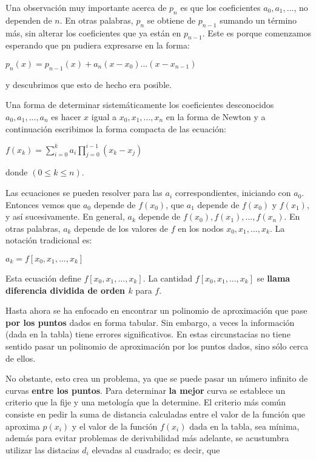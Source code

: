 \documentclass[10pt,a4paper]{article}
\begin{document}
\begin{multicols}{2}
\noindent Una observación muy importante acerca de $p_n$ es que los coeficientes $a_0, a_1,. ..$, no dependen de $n$. En otras palabras, $p_n$ se obtiene de $p_{n-1}$ sumando un término más, sin alterar los coeficientes que ya están en $p_{n-1}$. Este es porque comenzamos esperando que pn pudiera expresarse en la forma:
\begin{center}
	$p_n(x) = p_{n-1}(x) + a_n(x-x_0)...(x-x_{n-1})$
\end{center}


y descubrimos que esto de hecho era posible.

\noindent Una forma de determinar sistemáticamente los coeficientes desconocidos $a_0, a_1, . . . , a_n$ es hacer $x$ igual a $x_0, x_1, . . . , x_n$ en la forma de Newton y a continuación escribimos la forma compacta de las ecuación:
\begin{center}
	$f(x_k) = \displaystyle\sum_{i=0}^k a_i \displaystyle\prod_{j=0}^{i-1} (x_k - x_j)$
	
\end{center}
donde $(0 \le k \le n)$.

\noindent Las ecuaciones se pueden resolver para las $a_i$ correspondientes, iniciando con $a_0$. Entonces vemos que $a_0$ depende de $f(x_0)$, que $a_1$ depende de $f(x_0)$ y $f(x_1)$, y así sucesivamente. En general, $a_k$ depende de $f(x_0), f(x_1), . . . , f(x_n)$. En otras palabras, $a_k$ depende de los valores de $f$ en los nodos $x_0, x_1, . . . , x_k$. La notación tradicional es:
\begin{center}
	$a_k = f [x_0, x_1, . . . , x_k]$
\end{center}


\noindent Esta ecuación define $f[x_0, x_1, . . . , x_k]$. La cantidad $f [x_0, x_1, . . . , x_k]$ se \textbf{llama diferencia dividida de
orden $k$} para $f$.

\vspace*{0.2cm}


\vspace*{0.2cm}

Hasta ahora se ha enfocado en encontrar un polinomio de aproximación que pase \textbf{por los puntos} dados en forma tabular. Sin embargo, a veces la información (dada en la tabla) tiene errores significativos. En estas circunstacias no tiene sentido pasar un polinomio de aproximación por los puntos dados, sino sólo cerca de ellos.

No obstante, esto crea un problema, ya que se puede pasar un número infinito de curvas \textbf{entre los puntos}. Para determinar \textbf{la mejor} curva se establece un criterio que la fije y una metología que la determine. El criterio más común  consiste en pedir la suma de distancia calculadas entre el valor de la función que aproxima $p(x_i)$ y el valor de la función $f(x_i)$ dada en la tabla, sea mínima, además para evitar problemas de derivabilidad más adelante, se acustumbra utilizar las distacias $d_i$ elevadas al cuadrado; es decir, que


\end{multicols}
\end{document}
